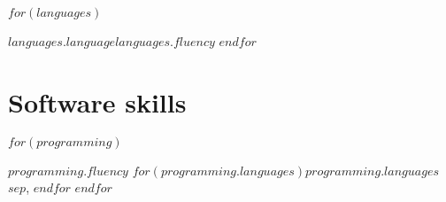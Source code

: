 \documentclass[fontsize=10pt]{tccv}
\begin{document}
\begin{factlist}
  $for(languages)$
\item{$languages.language$}{$languages.fluency$}
  $endfor$
\end{factlist}

\section{Software skills}

\begin{factlist}

  $for(programming)$
\item{$programming.fluency$}
  {$for(programming.languages)$$programming.languages$$sep$, $endfor$}
  $endfor$

\end{factlist}
\end{document}
